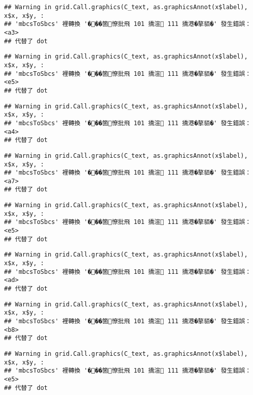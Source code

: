 \documentclass[
]{article}
\begin{document}
\begin{verbatim}
## Warning in grid.Call.graphics(C_text, as.graphicsAnnot(x$label), x$x, x$y, :
## 'mbcsToSbcs' 裡轉換 '���箇憭批飛 101 撟渲 111 撟港�摮貊�' 發生錯誤：<a3>
## 代替了 dot
\end{verbatim}

\begin{verbatim}
## Warning in grid.Call.graphics(C_text, as.graphicsAnnot(x$label), x$x, x$y, :
## 'mbcsToSbcs' 裡轉換 '���箇憭批飛 101 撟渲 111 撟港�摮貊�' 發生錯誤：<e5>
## 代替了 dot
\end{verbatim}

\begin{verbatim}
## Warning in grid.Call.graphics(C_text, as.graphicsAnnot(x$label), x$x, x$y, :
## 'mbcsToSbcs' 裡轉換 '���箇憭批飛 101 撟渲 111 撟港�摮貊�' 發生錯誤：<a4>
## 代替了 dot
\end{verbatim}

\begin{verbatim}
## Warning in grid.Call.graphics(C_text, as.graphicsAnnot(x$label), x$x, x$y, :
## 'mbcsToSbcs' 裡轉換 '���箇憭批飛 101 撟渲 111 撟港�摮貊�' 發生錯誤：<a7>
## 代替了 dot
\end{verbatim}

\begin{verbatim}
## Warning in grid.Call.graphics(C_text, as.graphicsAnnot(x$label), x$x, x$y, :
## 'mbcsToSbcs' 裡轉換 '���箇憭批飛 101 撟渲 111 撟港�摮貊�' 發生錯誤：<e5>
## 代替了 dot
\end{verbatim}

\begin{verbatim}
## Warning in grid.Call.graphics(C_text, as.graphicsAnnot(x$label), x$x, x$y, :
## 'mbcsToSbcs' 裡轉換 '���箇憭批飛 101 撟渲 111 撟港�摮貊�' 發生錯誤：<ad>
## 代替了 dot
\end{verbatim}

\begin{verbatim}
## Warning in grid.Call.graphics(C_text, as.graphicsAnnot(x$label), x$x, x$y, :
## 'mbcsToSbcs' 裡轉換 '���箇憭批飛 101 撟渲 111 撟港�摮貊�' 發生錯誤：<b8>
## 代替了 dot
\end{verbatim}

\begin{verbatim}
## Warning in grid.Call.graphics(C_text, as.graphicsAnnot(x$label), x$x, x$y, :
## 'mbcsToSbcs' 裡轉換 '���箇憭批飛 101 撟渲 111 撟港�摮貊�' 發生錯誤：<e5>
## 代替了 dot
\end{verbatim}
\end{document}
